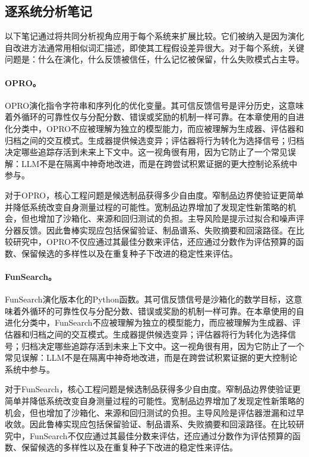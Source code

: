 \subsection{逐系统分析笔记}
\label{subsec:evolution-system-notes}

以下笔记通过将共同分析视角应用于每个系统来扩展比较。它们被纳入是因为演化自改进方法通常用相似词汇描述，即使其工程假设差异很大。对于每个系统，关键问题是：什么在演化，什么反馈被信任，什么记忆被保留，什么失败模式占主导。

\paragraph{OPRO。} OPRO演化指令字符串和序列化的优化变量。其可信反馈信号是评分历史，这意味着外循环的可靠性仅与分配分数、错误或奖励的机制一样可靠。在本章使用的自进化分类中，OPRO不应被理解为独立的模型能力，而应被理解为生成器、评估器和归档之间的交互模式。生成器提供候选变异；评估器将行为转化为选择信号；归档决定哪些追踪存活到未来上下文中。这一视角很有用，因为它防止了一个常见误解：LLM不是在隔离中神奇地改进，而是在跨尝试积累证据的更大控制论系统中参与。

对于OPRO，核心工程问题是候选制品获得多少自由度。窄制品边界使验证更简单并降低系统改变自身测量过程的可能性。宽制品边界增加了发现定性新策略的机会，但也增加了沙箱化、来源和回归测试的负担。主导风险是提示过拟合和噪声评分器反馈。因此鲁棒实现应包括保留验证、制品谱系、失败摘要和回滚路径。在比较研究中，OPRO不仅应通过其最佳分数来评估，还应通过分数作为评估预算的函数、保留候选的多样性以及在重复种子下改进的稳定性来评估。

\paragraph{FunSearch。} FunSearch演化版本化的Python函数。其可信反馈信号是沙箱化的数学目标，这意味着外循环的可靠性仅与分配分数、错误或奖励的机制一样可靠。在本章使用的自进化分类中，FunSearch不应被理解为独立的模型能力，而应被理解为生成器、评估器和归档之间的交互模式。生成器提供候选变异；评估器将行为转化为选择信号；归档决定哪些追踪存活到未来上下文中。这一视角很有用，因为它防止了一个常见误解：LLM不是在隔离中神奇地改进，而是在跨尝试积累证据的更大控制论系统中参与。

对于FunSearch，核心工程问题是候选制品获得多少自由度。窄制品边界使验证更简单并降低系统改变自身测量过程的可能性。宽制品边界增加了发现定性新策略的机会，但也增加了沙箱化、来源和回归测试的负担。主导风险是评估器泄漏和过早收敛。因此鲁棒实现应包括保留验证、制品谱系、失败摘要和回滚路径。在比较研究中，FunSearch不仅应通过其最佳分数来评估，还应通过分数作为评估预算的函数、保留候选的多样性以及在重复种子下改进的稳定性来评估。

